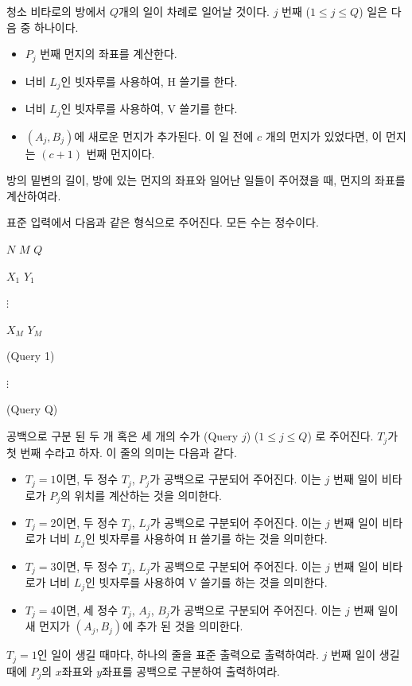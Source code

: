 \begin{problem}{청소}
	비타로의 방에서 $Q$개의 일이 차례로 일어날 것이다. $j$ 번째 ($1 \le j \le Q$) 일은 다음 중 하나이다.
	
	\begin{itemize}
		\item $P_j$ 번째 먼지의 좌표를 계산한다.
		\item 너비 $L_j$인 빗자루를 사용하여, H 쓸기를 한다.
		\item 너비 $L_j$인 빗자루를 사용하여, V 쓸기를 한다.
		\item $(A_j, B_j)$에 새로운 먼지가 추가된다. 이 일 전에 $c$ 개의 먼지가 있었다면, 이 먼지는 $(c+1)$ 번째 먼지이다.
	\end{itemize}
	
	방의 밑변의 길이, 방에 있는 먼지의 좌표와 일어난 일들이 주어졌을 때, 먼지의 좌표를 계산하여라.
	
	\InputFile
	
	표준 입력에서 다음과 같은 형식으로 주어진다. 모든 수는 정수이다.
	
	$N$ $M$ $Q$
	
	$X_1$ $Y_1$
	
	$\vdots$
	
	$X_M$ $Y_M$ 
	
	(Query 1)
	
	$\vdots$
	
	(Query Q)
	
	공백으로 구분 된 두 개 혹은 세 개의 수가 (Query $j$) ($1 \le j \le Q$) 로 주어진다. $T_j$가 첫 번째 수라고 하자. 이 줄의 의미는 다음과 같다.
	
	\begin{itemize}
		\item $T_j=1$이면, 두 정수 $T_j$, $P_j$가 공백으로 구분되어 주어진다. 이는 $j$ 번째 일이 비타로가 $P_j$의 위치를 계산하는 것을 의미한다.
		\item $T_j=2$이면, 두 정수 $T_j$, $L_j$가 공백으로 구분되어 주어진다. 이는 $j$ 번째 일이 비타로가 너비 $L_j$인 빗자루를 사용하여 H 쓸기를 하는 것을 의미한다.
		\item $T_j=3$이면, 두 정수 $T_j$, $L_j$가 공백으로 구분되어 주어진다. 이는 $j$ 번째 일이 비타로가 너비 $L_j$인 빗자루를 사용하여 V 쓸기를 하는 것을 의미한다.
		\item $T_j=4$이면, 세 정수 $T_j$, $A_j$, $B_j$가 공백으로 구분되어 주어진다. 이는 $j$ 번째 일이 새 먼지가 $(A_j, B_j)$에 추가 된 것을 의미한다.
	\end{itemize}
	
	
	\OutputFile
	
	
	$T_j=1$인 일이 생길 때마다, 하나의 줄을 표준 출력으로 출력하여라. $j$ 번째 일이 생길 때에 $P_j$의 $x$좌표와 $y$좌표를 공백으로 구분하여 출력하여라.
	

\end{problem}
